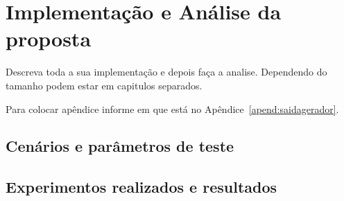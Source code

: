 \chapter{Implementação e Análise da proposta}\label{cap:imp}

Descreva toda a sua implementação e depois faça a analise. Dependendo do tamanho podem estar em capitulos separados.

Para colocar apêndice informe em que está no Apêndice~\ref{apend:saidagerador}.

\section{Cenários e parâmetros de teste}\label{simu}


\section{Experimentos realizados e resultados}\label{sec:7_resul}

